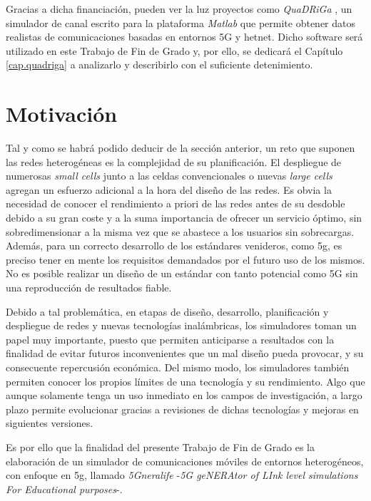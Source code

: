 Gracias a dicha financiación, pueden ver la luz proyectos como \textit{QuaDRiGa} \cite{quadriga}, un simulador de canal escrito para la plataforma \textit{Matlab} que permite obtener datos realistas de comunicaciones basadas en entornos 5G y \acs{hetnet}. Dicho software será utilizado en este Trabajo de Fin de Grado y, por ello, se dedicará el Capítulo \ref{cap.quadriga} a analizarlo y describirlo con el suficiente detenimiento.

\section{Motivación}

Tal y como se habrá podido deducir de la sección anterior, un reto que suponen las redes heterogéneas es la complejidad de su planificación. El despliegue de numerosas \textit{small cells} junto a las celdas convencionales o nuevas \textit{large cells} agregan un esfuerzo adicional a la hora del diseño de las redes. Es obvia la necesidad de conocer el rendimiento a priori de las redes antes de su desdoble debido a su gran coste y a la suma importancia de ofrecer un servicio óptimo, sin sobredimensionar a la misma vez que se abastece a los usuarios sin sobrecargas.
Además, para un correcto desarrollo de los estándares venideros, como \acs{5g}, es preciso tener en mente los requisitos demandados por el futuro uso de los mismos. No es posible realizar un diseño de un estándar con tanto potencial como 5G sin una reproducción de resultados fiable.

Debido a tal problemática, en etapas de diseño, desarrollo, planificación y despliegue de redes y nuevas tecnologías inalámbricas, los simuladores toman un papel muy importante, puesto que permiten anticiparse a resultados con la finalidad de evitar futuros inconvenientes que un mal diseño pueda provocar, y su consecuente repercusión económica. Del mismo modo, los simuladores también permiten conocer los propios límites de una tecnología y su rendimiento. Algo que aunque solamente tenga un uso inmediato en los campos de investigación, a largo plazo permite evolucionar gracias a revisiones de dichas tecnologías y mejoras en siguientes versiones.

Es por ello que la finalidad del presente Trabajo de Fin de Grado es la elaboración de un simulador de comunicaciones móviles de entornos heterogéneos, con enfoque en \acs{5g}, llamado \textit{5Gneralife} -\textit{5G geNERAtor of LInk level simulations For Educational purposes}-.

